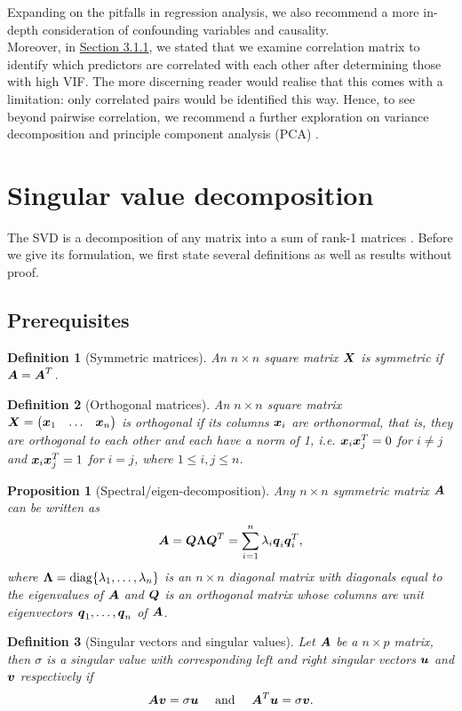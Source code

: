 \documentclass[12pt]{article}
\newtheorem{prop}{Proposition}[section]
\newtheorem{dfn}{Definition}[section]
\DeclareMathOperator{\diag}{diag}
\begin{document}
	Expanding on the pitfalls in regression analysis, we also recommend a more in-depth consideration of confounding variables and causality. \\
	
	Moreover, in \hyperref[sec:311]{Section 3.1.1}, we stated that we examine correlation matrix to identify which predictors are correlated with each other after determining those with high VIF. The more discerning reader would realise that this comes with a limitation: only correlated pairs would be identified this way. Hence, to see beyond pairwise correlation, we recommend a further exploration on variance decomposition and principle component analysis (PCA) \cite{Johnston2018}.
	
	\pagebreak
	
	\appendix %
	\section{\label{sec:svd}Singular value decomposition}
	The SVD is a decomposition of any matrix into a sum of rank-1 matrices \cite{Strang2019}. Before we give its formulation, we first state several definitions as well as results without proof.
	\subsection{Prerequisites}
	\begin{dfn}[Symmetric matrices]
		An $n\times n$ square matrix $\boldsymbol{X}$ is symmetric if $\boldsymbol{A}=\boldsymbol{A}^T$.
	\end{dfn}
	\begin{dfn}[Orthogonal matrices]
		An $n\times n$ square matrix $\boldsymbol{X}=\begin{pmatrix}
			\boldsymbol{x}_1 & \ldots & \boldsymbol{x}_n
		\end{pmatrix}$ is orthogonal if its columns $\boldsymbol{x}_i$ are orthonormal, that is, they are orthogonal to each other and each have a norm of 1, i.e. $\boldsymbol{x}_i\boldsymbol{x}_j^T=0$ for $i\neq j$ and $\boldsymbol{x}_i\boldsymbol{x}_j^T=1$ for $i=j$, where $1\leq i,j\leq n$.
	\end{dfn}
	\begin{prop}[Spectral/eigen-decomposition]
		Any $n\times n$ symmetric matrix $\boldsymbol{A}$ can be written as 
		$$\boldsymbol{A}=\boldsymbol{Q}\boldsymbol{\Lambda}\boldsymbol{Q}^T=\sum_{i=1}^{n}\lambda_i\boldsymbol{q}_i\boldsymbol{q}_i^T,$$
		where $\boldsymbol{\Lambda}=\diag\{\lm_1,\ldots,\lm_n\}$ is an $n\times n$ diagonal matrix with diagonals equal to the eigenvalues of $\boldsymbol{A}$ and $\boldsymbol{Q}$ is an orthogonal matrix whose columns are unit eigenvectors $\boldsymbol{q}_1,\ldots,\boldsymbol{q}_n$ of $\boldsymbol{A}$.
	\end{prop}
	\begin{dfn}[Singular vectors and singular values]
		Let $\boldsymbol{A}$ be a $n\times p$ matrix, then $\sigma$ is a singular value with corresponding left and right singular vectors $\boldsymbol{u}$ and $\boldsymbol{v}$ respectively if
		$$\boldsymbol{A}\boldsymbol{v}=\sigma\boldsymbol{u} \quad \text{ and }\quad \boldsymbol{A}^T\boldsymbol{u}=\sigma\boldsymbol{v}.$$
	\end{dfn}
	
\end{document}
